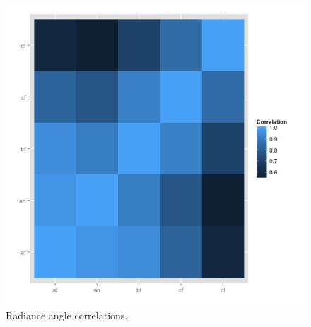 \documentclass[11pt]{article}\usepackage[]{graphicx}\usepackage[]{color}
\newenvironment{knitrout}{}{} %
\begin{document}
\begin{knitrout}
\color{fgcolor}\begin{figure}[]

\includegraphics[width=0.49\linewidth]{figure/plot-cor-1} \caption[Radiance angle correlations]{Radiance angle correlations.\label{fig:plot-cor}}
\end{figure}


\end{knitrout}
\end{document}
